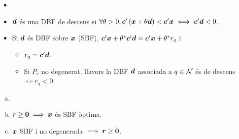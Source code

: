 \begin{defi}
    \begin{itemize}
        \item[]
        \item $\boldsymbol{d}$ és una DBF de descens si $\forall \theta > 0, \boldsymbol{c}'\left(\boldsymbol{x} + \theta \boldsymbol{d}\right) < \boldsymbol{c}'\boldsymbol{x} \iff \boldsymbol{c}'\boldsymbol{d} < 0$.
        \item Si $\boldsymbol{d}$ és DBF sobre $\boldsymbol{x}$ (SBF), $\boldsymbol{c}'\boldsymbol{x} + \theta^*\boldsymbol{c}'\boldsymbol{d} = \boldsymbol{c}'\boldsymbol{x} + \theta^*r_q$ i
            \begin{itemize}
                \item $r_q = \boldsymbol{c}'\boldsymbol{d}$.
                \item Si $P_e$ no degenerat, llavors la DBF $\boldsymbol{d}$ associada a $q \in \mathcal{N}$ és de descens $\iff r_q < 0$.
            \end{itemize}
    \end{itemize}
\end{defi}
\begin{teo*}
    \begin{enumerate}[a)]
        \item[]
        \item $r \geq \boldsymbol{0} \implies \boldsymbol{x}$ és SBF òptima.
        \item $\boldsymbol{x}$ SBF i no degenerada $\implies \boldsymbol{r} \geq \boldsymbol{0}$.
    \end{enumerate}
\end{teo*}

